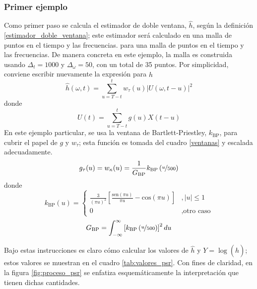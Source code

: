 \documentclass[12pt,letterpaper]{book}
\newcommand{\intR}{\int_{-\infty}^{\infty}}
\newcommand{\COS}[1]{\mathrm{cos}\left( #1 \right)}
\newcommand{\SEN}[1]{\mathrm{sen}\left( #1 \right)}
\newcommand{\abso}[1]{\left| #1 \right|}
\begin{document}
\subsubsection{Primer ejemplo}

Como primer paso se calcula el estimador de doble ventana, $\widehat{h}$, según la definición \ref{estimador_doble_ventana}; este estimador será calculado en una malla de puntos en el tiempo y las frecuencias.
%
para una malla de puntos en el tiempo y las frecuencias.
%
De manera concreta en este ejemplo, la malla es construida usando $\Delta_t = 1000$ y $\Delta_\omega=50$, con un total de 35 puntos.
%
Por simplicidad, conviene escribir nuevamente la expresión para $\widehat{h}$
\begin{equation}
\widehat{h}(\omega, t) = \sum_{u=T-t}^t w_\tau (u) \abso{U(\omega,t-u)}^{2}
\end{equation}
donde
\begin{equation}
U(t) = \sum_{u=T-t}^t g(u) X(t-u)
\end{equation}
%
En este ejemplo particular, se usa la ventana de Bartlett-Priestley, $k_\text{BP}$, para cubrir el papel de $g$ y $w_\tau$; esta función es tomada del cuadro \ref{ventanas} y escalada adecuadamente.
\begin{equation}
g_\tau(u) = w_\kappa(u) = \frac{1}{G_{\text{BP}}} k_{\text{BP}}\left( \nicefrac{u}{500} \right)
\end{equation}
donde
\begin{equation}
k_{\text{BP}} (u) = \begin{cases}
\frac{3}{\left( \pi u \right)^2} 
\left[ 
\frac{\SEN{\pi u}}{\pi u} - \COS{\pi u} \right] &, \abso{u} 
\leq 1 \\
0 &, \text{otro caso}
\end{cases}
\end{equation}
\begin{equation}
G_{\text{BP}} = \intR \left[ k_{\text{BP}}\left( \nicefrac{u}{500} \right) \right]^2 du
\end{equation}

Bajo estas instrucciones es claro cómo calcular los valores de $\widehat{h}$ y $Y = \log\left( \widehat{h} \right)$; estos valores se muestran en el cuadro \ref{tab:valores_psr}.
%
Con fines de claridad, en la figura \ref{fig:proceso_psr} se enfatiza esquemáticamente la interpretación que tienen dichas cantidades.
\end{document}
